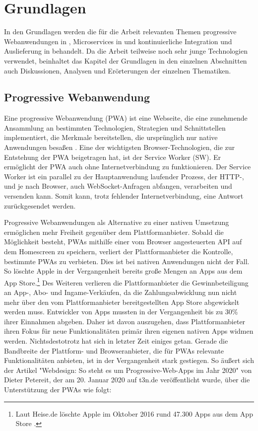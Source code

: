 \chapter{Grundlagen}
\label{chap:grundlagen}
In den Grundlagen werden die für die Arbeit relevanten Themen progressive Webanwendungen in ,
Microservices in  und kontinuierliche Integration und Auslieferung
in  behandelt. Da die Arbeit teilweise noch
sehr junge Technologien verwendet, beinhaltet das Kapitel der Grundlagen in den einzelnen Abschnitten
auch Diskussionen, Analysen und Erörterungen der einzelnen Thematiken.

\section{Progressive Webanwendung}
\label{sec:progressivewebanwendung}
Eine progressive Webanwendung (PWA) ist eine Webseite, die eine zunehmende Ansammlung
an bestimmten Technologien, Strategien und Schnittstellen implementiert,
die Merkmale bereitstellen, die ursprünglich nur native Anwendungen besaßen \cite{WikiPWA}.
Eine der wichtigsten Browser-Technologien, die zur Entstehung der PWA beigetragen hat,
ist der Service Worker (SW). Er ermöglicht der PWA auch ohne Internetverbindung zu funktionieren. Der 
Service Worker ist ein parallel zu der Hauptanwendung laufender Prozess, der \mbox{HTTP-,} und je nach Browser,
auch WebSocket-Anfragen abfangen, verarbeiten und versenden kann. Somit kann, trotz fehlender Internetverbindung,
eine Antwort zurückgesendet werden.\cite{W3ServiceWorker}

Progressive Webanwendungen als Alternative zu einer nativen Umsetzung ermöglichen mehr Freiheit gegenüber dem
Plattformanbieter. Sobald die Möglichkeit besteht, PWAs mithilfe einer vom Browser angesteuerten API
auf dem Homescreen zu speichern, verliert der Plattformanbieter die Kontrolle,
bestimmte PWAs zu verbieten. Dies ist bei nativen Anwendungen nicht der Fall. So löschte Apple in der Vergangenheit
bereits große Mengen an Apps aus dem App Store.\footnote{Laut Heise.de löschte Apple im Oktober
2016 rund 47.300 Apps aus dem App Store \cite{HeiseAppleLoeschtApps}.}
Des Weiteren verlieren die Plattformanbieter die Gewinnbeteiligung an App-, Abo- und Ingame-Verkäufen,
da die Zahlungsabwicklung nun nicht mehr über den vom Plattformanbieter bereitgestellten App Store
abgewickelt werden muss. Entwickler von Apps mussten in der Vergangenheit bis zu 30\% 
ihrer Einnahmen abgeben.\cite{WinFutureEigenerAppStore} Daher ist davon auszugehen,
dass Plattformanbieter ihren Fokus für neue Funktionalitäten primär ihren eigenen
nativen Apps widmen werden. Nichtsdestotrotz hat sich in letzter Zeit einiges getan.
Gerade die Bandbreite der Plattform- und Browseranbieter, die für PWAs relevante
Funktionalitäten anbieten, ist in der Vergangenheit stark gestiegen. So äußert sich der Artikel
"Webdesign: So steht es um Progressive-Web-Apps im Jahr 2020" von Dieter Petereit,
der am 20. Januar 2020 auf t3n.de veröffentlicht wurde, über die Unterstützung der PWAs wie folgt:

